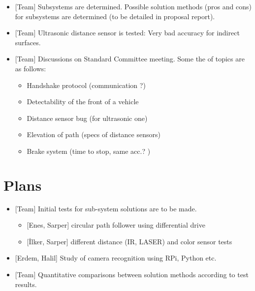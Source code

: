 \documentclass[a4paper,12pt]{article}
\begin{document}
\begin{itemize}
\item {[Team]} Subsystems  are determined. Possible solution methods (pros and cons) for subsystems are determined (to be detailed in proposal report).
\item {[Team]} Ultrasonic distance sensor is tested: Very bad accuracy for indirect surfaces.
\item {[Team]} Discussions on Standard Committee meeting. Some the of topics are as follows:
\begin{itemize}
	\item Handshake protocol (communication ?)
	\item Detectability of the front of a vehicle 
	\item Distance sensor bug  (for ultrasonic one)
	\item Elevation of path		(specs of distance sensors)
	\item Brake system		(time to stop, same acc.? )
\end{itemize}
\end{itemize}

\section{Plans}

\begin{itemize}
	\item  {[Team]} Initial tests for sub-system solutions are to be made.
	\begin{itemize}
		\item {[Enes, Sarper]}  circular path follower using differential drive
		\item {[İlker, Sarper]} different distance (IR, LASER) and color sensor tests
	\end{itemize}
	\item {[Erdem, Halil]} Study of camera recognition using RPi, Python etc.
	\item  {[Team]} Quantitative comparisons between solution methods according to test results.
	
	
\end{itemize}



	


\end{document}
